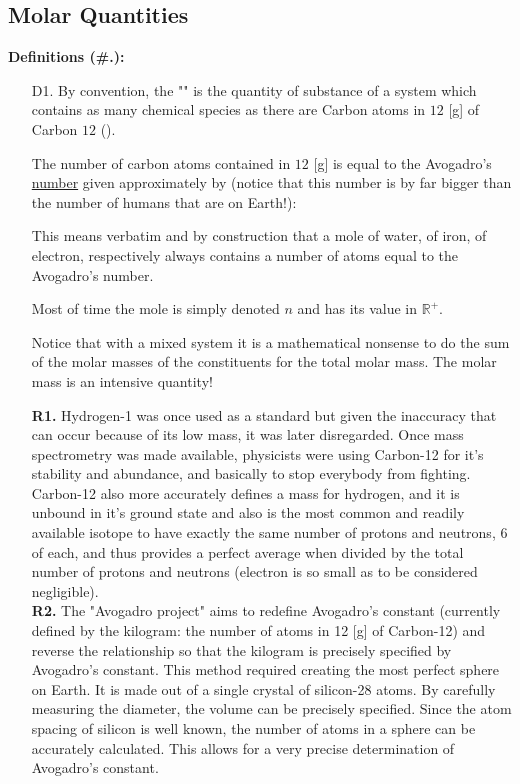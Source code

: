 	\subsection{Molar Quantities}
	\textbf{Definitions (\#\thesection.\mydef):}
	\begin{enumerate}
		\item[D1.] By convention, the "" is the quantity of substance of a system which contains as many chemical species as there are Carbon atoms in $12$ [g] of Carbon $12$ ().
		
		The number of carbon atoms contained in $12$ [g] is equal to the Avogadro's \underline{number} given approximately by (notice that this number is by far bigger than the number of humans that are on Earth!):
		
		This means verbatim and by construction that a mole of water, of iron, of electron, respectively always contains a number of atoms equal to the Avogadro's number.
		
		Most of time the mole is simply denoted $n$ and has its value in $\mathbb{R}^{+}$.
		
		Notice that with a mixed system it is a mathematical nonsense to do the sum of the molar masses of the constituents for the total molar mass. The molar mass is an intensive quantity!
		\begin{tcolorbox}[title=Remarks,arc=10pt,breakable,drop lifted shadow,
  skin=enhanced,
  skin first is subskin of={enhancedfirst}{arc=10pt,no shadow},
  skin middle is subskin of={enhancedmiddle}{arc=10pt,no shadow},
  skin last is subskin of={enhancedlast}{drop lifted shadow}]
		\textbf{R1.} Hydrogen-1 was once used as a standard but given the inaccuracy that can occur because of its low mass, it was later disregarded. Once mass spectrometry was made available, physicists were using Carbon-12 for it's stability and abundance, and basically to stop everybody from fighting. Carbon-12 also more accurately defines a mass for hydrogen, and it is unbound in it's ground state and also is the most common and readily available isotope to have exactly the same number of protons and neutrons, $6$ of each, and thus provides a perfect average when divided by the total number of protons and neutrons (electron is so small as to be considered negligible). \\
		
		\textbf{R2.} The "Avogadro project" aims to redefine Avogadro's constant (currently defined by the kilogram: the number of atoms in 12 [g] of Carbon-12) and reverse the relationship so that the kilogram is precisely specified by Avogadro's constant. This method required creating the most perfect sphere on Earth. It is made out of a single crystal of silicon-28 atoms. By carefully measuring the diameter, the volume can be precisely specified. Since the atom spacing of silicon is well known, the number of atoms in a sphere can be accurately calculated. This allows for a very precise determination of Avogadro's constant.
		\end{tcolorbox}	
		

\end{enumerate}
